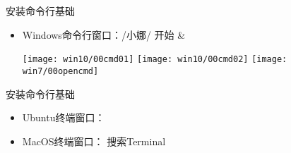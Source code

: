 \documentclass[fontset = none, t]{ctexbeamer}
\begin{document}
\begin{frame}[fragile]{安装\tl}{命令行基础}
    \begin{itemize}
    \item Windows命令行窗口：\setmenukeyswin {}/小娜/
      开始 \& \\
      \begin{center}
        \texttt{[image: win10/00cmd01]}
        \texttt{[image: win10/00cmd02]}
        \texttt{[image: win7/00opencmd]}\\
        \begin{minipage}[h]{0.95\linewidth}
        \end{minipage}
      \end{center}    
    \end{itemize}
\end{frame}

\begin{frame}[fragile]{安装\tl}{命令行基础}
    \begin{itemize}
    \item Ubuntu终端窗口：\setmenukeyswin {}\\
      \begin{center}
        \begin{minipage}[h]{0.9\linewidth}
        \end{minipage}
      \end{center}
    \item MacOS终端窗口：\setmenukeysmac \keys{\cmd +
        \Space} 搜索Terminal\\
      \begin{center}
        \begin{minipage}[h]{0.9\linewidth}
        \end{minipage}
      \end{center}
    \end{itemize}
\end{frame}
\end{document}
